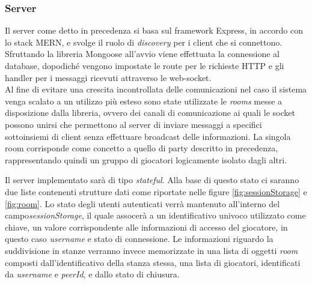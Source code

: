 \subsubsection{Server}
Il server come detto in precedenza si basa sul framework Express, in accordo con lo stack MERN, e svolge il ruolo di \emph{discovery} per i client che si connettono. Sfruttando la libreria Mongoose all'avvio viene effettuata la connessione al database, dopodiché vengono impostate le route per le richieste HTTP e gli handler per i messaggi ricevuti attraverso le web-socket.\\[\baselineskip]\indent
Al fine di evitare una crescita incontrollata delle comunicazioni nel caso il sistema venga scalato a un utilizzo più esteso sono state utilizzate le \emph{rooms} \cite{socketIORooms} messe a disposizione dalla libreria, ovvero dei canali di comunicazione ai quali le socket possono unirsi che permettono al server di inviare messaggi a specifici sottoinsiemi di client senza effettuare broadcast delle informazioni. La singola room corrisponde come concetto a quello di party descritto in precedenza, rappresentando quindi un gruppo di giocatori logicamente isolato dagli altri.

Il server implementato sarà di tipo \emph{stateful}. Alla base di questo stato ci saranno due liste contenenti strutture dati come riportate nelle figure \ref{fig:sessionStorage} e \ref{fig:room}.
Lo stato degli utenti autenticati verrà mantenuto all'interno del campo\emph{sessionStorage}, il quale assocerà a un identificativo univoco utilizzato come chiave, un valore corrispondente alle informazioni di accesso del giocatore, in questo caso \emph{username} e stato di connessione. Le informazioni riguardo la suddivisione in stanze verranno invece memorizzate in una lista di oggetti \emph{room} composti dall'identificativo della stanza stessa, una lista di giocatori, identificati da \emph{username} e \emph{peerId}, e dallo stato di chiusura.

